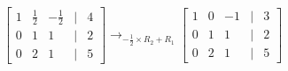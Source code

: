 \documentclass[preview]{standalone}
\begin{document}
\begin{align*}
\begin{bmatrix} 1 & \frac{1}{2} & -\frac{1}{2} & | & 4 \\ 0 & 1 & 1 & | & 2 \\ 0 & 2 & 1 & | & 5 \end{bmatrix} \rightarrow_{-\frac{1}{2}\times R_2 + R_1} \begin{bmatrix} 1 & 0 & -1 & | & 3 \\ 0 & 1 & 1 & | & 2 \\ 0 & 2 & 1 & | & 5 \end{bmatrix}
\end{align*}
\end{document}
